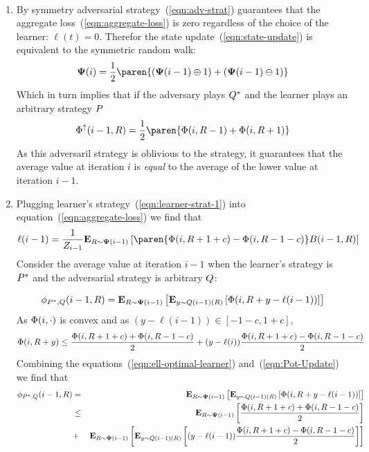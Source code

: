 \documentclass{article}[12pt]
\begin{document}
\proof ~\\
\begin{enumerate}
\item By symmetry adversarial strategy~(\ref{eqn:adv-strat}) guarantees that
  the aggregate loss~(\ref{eqn:aggregate-loss}) is zero regardless of
  the choice of the learner: $\ell(t)=0$.
  Therefor the state update~(\ref{eqn:state-update}) is equivalent to
  the symmetric random walk:
  $$\state(i) = \frac{1}{2} \paren{(\state(i-1) \oplus 1) + (\state(i-1)
    \ominus 1)}$$
  Which in turn implies that if the adversary plays $Q^*$
  and the learner plays an arbitrary strategy $P$
  \begin{equation} \label{eqn:lower}
    \lowerpot(i-1,\R) = \frac{1}{2} \paren{\pot(i,\R-1)+\pot(i,\R+1)}
  \end{equation}
  As this adversaril strategy is oblivious to the strategy, it
  guarantees that the average value at iteration $i$ is {\em equal} to the
  average of the lower value at iteration $i-1$.
\item
 Plugging learner's strategy~(\ref{eqn:learner-strat-1}) into equation~(\ref{eqn:aggregate-loss}) we find that
 \begin{equation} \label{eqn:ell-optimal-learner}
   \ell(i-1) = \frac{1}{Z_{i-1}} \E{\R \sim \state(i-1)}{\paren{\pot(i,\R+1+c)-\pot(i,\R-1-c)}
   \Bias(i-1,\R)}
\end{equation}
  Consider the average value at iteration $i-1$ when the learner's strategy
  is $P^*$ and the adversarial strategy is arbitrary $Q$:
  
   \begin{equation} \label{eqn:Pot-Update}
    \phi_{P^*,Q}(i-1,R) = {\bf E}_{R \sim {\bf \Psi}(i-1)}\left[  {\bf E}_{y \sim
      Q(i-1)(R)}\left[ \Phi(i,R+y-\ell(i-1)) \right] \right]
  \end{equation}
  As $\Phi(i,\cdot)$ is convex and as $(y-\ell(i-1)) \in [-1-c,1+c]$,
  \begin{equation} \label{eqn:pot-upper}
    \Phi(i,R+y) \leq \frac{\Phi(i,R+1+c)+\Phi(i,R-1-c)}{2} +
    (y-\ell(i)) \frac{\Phi(i,R+1+c)-\Phi(i,R-1-c)}{2}
    \end{equation}
  Combining the equations~(\ref{eqn:ell-optimal-learner}) and~(\ref{eqn:Pot-Update}) we find that
  \begin{eqnarray}
  \phi_{P^*,Q}(i-1,R)&=&{\bf E}_{R \sim {\bf \Psi}(i-1)}\left[ {\bf E}_{y \sim Q(i-1)(R)}\left[ \Phi(i,R+y-\ell(i-1)) \right] \right]\\
  &\leq & {\bf E}_{R \sim {\bf \Psi}(i-1)}\left[ \frac{\Phi(i,R+1+c)+\Phi(i,R-1-c)}{2} \right]\\
  &+&
  {\bf E}_{R \sim {\bf \Psi}(i-1)}\left[ {\bf E}_{y \sim Q(i-1)(R)}\left[ (y-\ell(i-1)) \frac{\Phi(i,R+1+c)-\Phi(i,R-1-c)}{2} \right] \right] \label{eqn:zero-term}
  \end{eqnarray}
  

\end{enumerate}
\end{document}
